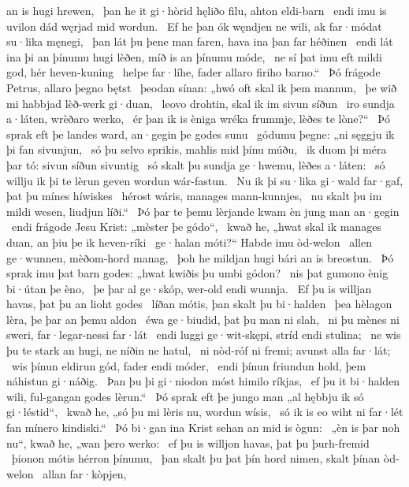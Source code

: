 an is hugi hrewen, \hld\ þan he it gi·hòrid hęliðo filu,
ahton eldi-barn \hld\ endi imu is uvilon dád
węrjad mid wordun. \hld\ Ef he þan ók węndjen ne wili,
ak far·módat su·lika męnegi, \hld\ þan lát þu þene man faren,
hava ina þan far héðinen \hld\ endi lát ina þi an þínumu hugi lèðen,
míð is an þínumu móde, \hld\ ne sí þat imu eft mildi god,
hér heven-kuning \hld\ helpe far·líhe,
fader allaro firiho barno.“ \hld\ Þó frágode Petrus,
allaro þegno bętst \hld\ þeodan sínan:
„hwó oft skal ik þem mannun, \hld\ þe wið mi habbjad
lèð-werk gi·duan, \hld\ leovo drohtin,
skal ik im sivun síðun \hld\ iro sundja a·láten,
wrèðaro werko, \hld\ ér þan ik is èniga wréka frummje,
lèðes te lòne?“ \hld\ Þó sprak eft þe landes ward,
an·gegin þe godes sunu \hld\ gódumu þegne:
„ni sęggju ik þi fan sivunjun, \hld\ só þu selvo sprikis,
mahlis mid þínu múðu, \hld\ ik duom þi méra þar tó:
sivun síðun sivuntig \hld\ só skalt þu sundja ge·hwemu,
lèðes a·láten: \hld\ só willju ik þi te lèrun geven
wordun wár-fastun. \hld\ Nu ik þi su·lika gi·wald far·gaf,
þat þu mínes híwiskes \hld\ hérost wáris,
manages mann-kunnjes, \hld\ nu skalt þu im mildi wesen,
liudjun líði.“ \hld\ Þó þar te þemu lèrjande kwam
èn jung man an·gegin \hld\ endi frágode Jesu Krist:
„mèster þe gódo“, \hld\ kwað he, „hwat skal ik manages duan,
an þiu þe ik heven-ríki \hld\ ge·halan móti?“
Habde imu òd-welon \hld\ allen ge·wunnen,
mèðom-hord manag, \hld\ þoh he mildjan hugi
bári an is breostun. \hld\ Þó sprak imu þat barn godes:
„hwat kwiðis þu umbi gódon? \hld\ nis þat gumono ènig
bi·útan þe èno, \hld\ þe þar al ge·skóp,
wer-old endi wunnja. \hld\ Ef þu is willjan havas,
þat þu an lioht godes \hld\ líðan mótis,
þan skalt þu bi·halden \hld\ þea hèlagon lèra,
þe þar an þemu aldon \hld\ éwa ge·biudid,
þat þu man ni slah, \hld\ ni þu mènes ni sweri,
far·legar-nessi far·lát \hld\ endi luggi ge·wit-skępi,
stríd endi stulina; \hld\ ne wis þu te stark an hugi,
ne níðin ne hatul, \hld\ ni nòd-róf ni fremi;
avunst alla far·lát; \hld\ wis þínun eldirun gód,
fader endi móder, \hld\ endi þínun friundun hold,
þem náhistun gi·náðig. \hld\ Þan þu þi gi·niodon móst
himilo ríkjas, \hld\ ef þu it bi·halden wili,
ful-gangan godes lèrun.“ \hld\ Þó sprak eft þe jungo man
„al hębbju ik só gi·léstid“, \hld\ kwað he, „só þu mi lèris nu,
wordun wísis, \hld\ só ik is eo wiht ni far·lét
fan mínero kindiski.“ \hld\ Þó bi·gan ina Krist sehan
an mid is ògun: \hld\ „èn is þar noh nu“, kwað he,
„wan þero werko: \hld\ ef þu is willjon havas,
þat þu þurh-fremid \hld\ þionon mótis
hérron þínumu, \hld\ þan skalt þu þat þín hord nimen,
skalt þínan òd-welon \hld\ allan far·kòpjen,
